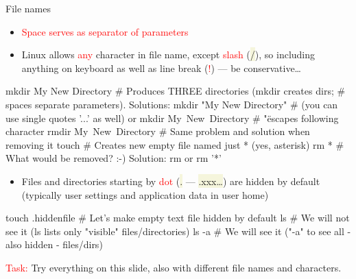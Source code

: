 \documentclass[compress, ucs, xelatex, 11pt, xcolor=svgnames, aspectratio=169,
	hyperref={
		bookmarks=true,
		unicode=true,
		colorlinks=true,
		pdftitle={Linux, command line and MetaCentrum},
		plainpages=false,
		pdfauthor={Vojtech Zeisek},
		pdfsubject={Course about use of Linux command line, writing shell scripts and using MetaCentrum of CESNET},
		pdfcreator={XeLaTeX},
		pdfkeywords={Linux, GNU, BASH, shell, command line, MetaCentrum},
		linkcolor=DarkRed, %
		anchorcolor=DarkBlue, %
		citecolor=Indigo, %
		filecolor=NavyBlue, %
		menucolor=DarkMagenta, %
		urlcolor=DarkBlue, %
		pdftex},
	url={hyphens, lowtilde} %
	]{beamer}
\renewcommand{\texttt}[1]{\colorbox{Beige}{{\ttfamily #1}}}
\renewcommand{\alert}[1]{\textcolor{red}{#1}}
\begin{document}
\begin{frame}[fragile]{File names}
	\label{filenames}
	\begin{itemize}
		\item \alert{Space serves as separator of parameters}
		\item Linux allows \alert{any} character in file name, except \alert{slash} (\texttt{/}), so including anything on keyboard as well as line break (\alert{!}) --- be conservative\ldots
	\end{itemize}
	\begin{bashcode}
    mkdir My New Directory # Produces THREE directories (mkdir creates dirs;
                           # spaces separate parameters). Solutions:
    mkdir "My New Directory" # (you can use single quotes '...' as well) or
    mkdir My\ New\ Directory # "\" escapes following character
    rmdir My\ New\ Directory # Same problem and solution when removing it
    touch \* # Creates new empty file named just * (yes, asterisk)
    rm * # What would be removed? :-) Solution: rm \* or rm '*'
	\end{bashcode}
	\begin{itemize}
		\item Files and directories starting by \alert{dot} (\texttt{.} --- \texttt{.xxx\ldots}) are hidden by default (typically user settings and application data in user home)
	\end{itemize}
	\begin{bashcode}
    touch .hiddenfile # Let's make empty text file hidden by default
    ls # We will not see it (ls lists only "visible" files/directories)
    ls -a # We will see it ("-a" to see all - also hidden - files/dirs)
	\end{bashcode}
	\alert{Task:} Try everything on this slide, also with different file names and characters.
\end{frame}
\end{document}
